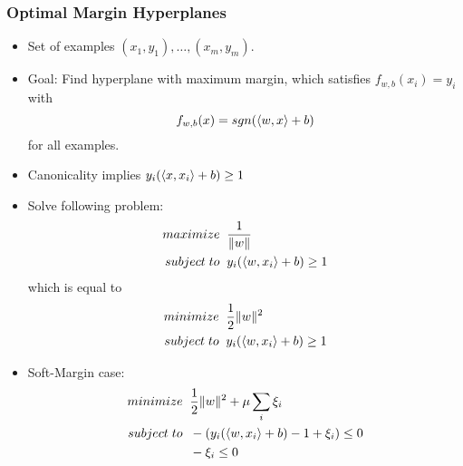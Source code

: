 \subsubsection*{Optimal Margin Hyperplanes}
\begin{itemize}
    \item
        Set of examples $(x_1, y_1), \dots, (x_m, y_m)$.
    \item
        Goal: Find hyperplane with maximum margin, which satisfies $f_{w,b}(x_i) = y_i$ with
        $$f_{w,b}(x) = sgn(\langle w,x\rangle+b)$$
        for all examples.
    \item
        Canonicality implies $y_i(\langle x, x_i\rangle+b) \geq 1$
    \item
        Solve following problem:
        \begin{align*}
            maximize \; \; & \ffrac{1}{\norm{w}}\\
            subject \; to \; \; & y_i(\inner{w, x_i}+b) \geq 1 %
        \end{align*}
        which is equal to
        \begin{align*}
            minimize \; \; & \ffrac{1}{2}\norm{w}^2\\
            subject \; to \; \; & y_i(\inner{w, x_i}+b) \geq 1 %
        \end{align*}
    \item
        Soft-Margin case:
        \begin{align*}
            minimize \; \; & \ffrac{1}{2}\norm{w}^2 + \mu \sum_i \xi_i\\
            subject \; to \; \; & -(y_i(\inner{w, x_i}+b)-1+\xi_i) \leq 0 \\%
            & -\xi_i \leq 0 \;\; %
        \end{align*}

\end{itemize}

